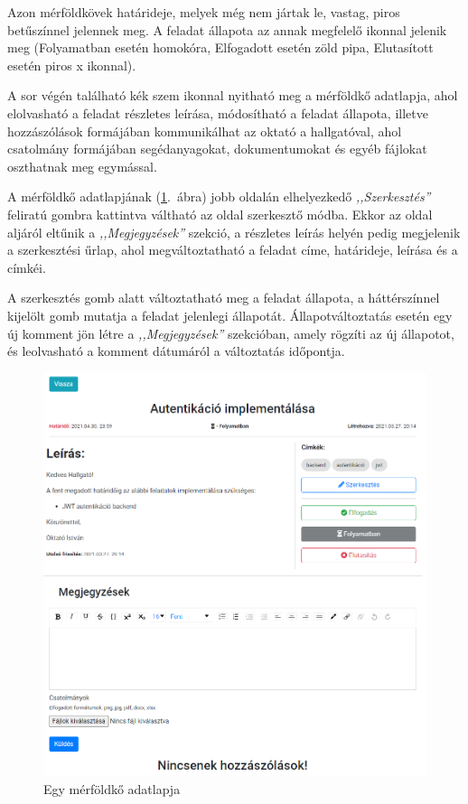 \documentclass[
]{thesis-ekf}
\theoremstyle{definition}
\theoremstyle{remark}
\begin{document}
	Azon mérföldkövek határideje, melyek még nem jártak le, vastag, piros betűszínnel jelennek meg. A feladat állapota az annak megfelelő ikonnal jelenik meg (Folyamatban esetén homokóra, Elfogadott esetén zöld pipa, Elutasított esetén piros x ikonnal).
	
	A sor végén található kék szem ikonnal nyitható meg a mérföldkő adatlapja, ahol elolvasható a feladat részletes leírása, módosítható a feladat állapota, illetve hozzászólások formájában kommunikálhat az oktató a hallgatóval, ahol csatolmány formájában segédanyagokat, dokumentumokat és egyéb fájlokat oszthatnak meg egymással.
	
	A mérföldkő adatlapjának (\ref{fig:oktato_merfoldko_adatlap}.~ábra) jobb oldalán elhelyezkedő \emph{,,Szerkesztés''} feliratú gombra kattintva váltható az oldal szerkesztő módba. Ekkor az oldal aljáról eltűnik a \emph{,,Megjegyzések''} szekció, a részletes leírás helyén pedig megjelenik a szerkesztési űrlap, ahol megváltoztatható a feladat címe, határideje, leírása és a címkéi.
	
	A szerkesztés gomb alatt változtatható meg a feladat állapota, a háttérszínnel kijelölt gomb mutatja a feladat jelenlegi állapotát. Állapotváltoztatás esetén egy új komment jön létre a \emph{,,Megjegyzések''} szekcióban, amely rögzíti az új állapotot, és leolvasható a komment dátumáról a változtatás időpontja.
	
	\begin{figure}[!h]
		\centering
		\includegraphics[width=11.5cm]{kepek/screenshots/oktato_merfoldko_adatlap.png}
		\caption{Egy mérföldkő adatlapja}
		\label{fig:oktato_merfoldko_adatlap}
	\end{figure}
	
\end{document}
